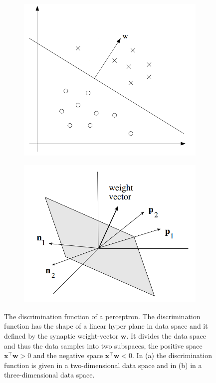 \begin{figure}
	\centering
	\begin{subfigure}[t]{.45\textwidth}
	 	\centering
  		\includegraphics[width=.9\linewidth]{imgs/percept_discr1.png}
  		\caption{}
	\end{subfigure}
	\begin{subfigure}[t]{.45\textwidth}
	 	\centering
  		\includegraphics[width=.9\linewidth]{imgs/percept_discr2.png}
  		 \caption{}
	\end{subfigure}
    \caption{The discrimination function of a perceptron. The discrimination function has the shape of a linear hyper plane in data space and it defined by the synaptic weight-vector $\textbf{w}$. It divides the data space and thus the data samples into two subspaces, the positive space $\textbf{x}^{\intercal}\textbf{w} > 0$ and the negative space $\textbf{x}^{\intercal}\textbf{w} < 0$. In (a) the discrimination function is given in a two-dimensional data space and in (b) in a three-dimensional data space.}
	\label{fig:discrimation}
\end{figure}


